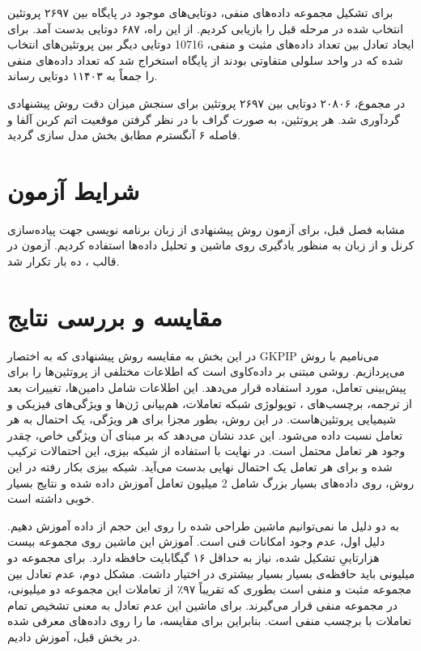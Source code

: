 برای تشکیل مجموعه داده‌های منفی، دوتایی‌های موجود در پایگاه  بین ۲۶۹۷ پروتئین انتخاب شده در مرحله قبل را بازیابی کردیم. از این راه، ۶۸۷ دوتایی بدست آمد. برای ایجاد تعادل بین تعداد داده‌های مثبت و منفی، 10716 دوتایی دیگر بین پروتئین‌های انتخاب شده که در واحد سلولی متفاوتی بودند از پایگاه  استخراج شد که تعداد داده‌های منفی را جمعاً به ۱۱۴۰۳ دوتایی رساند.

در مجموع، ۲۰۸۰۶ دوتایی بین ۲۶۹۷ پروتئین برای سنجش میزان دقت روش پیشنهادی گردآوری شد. هر پروتئین، به صورت گراف با در نظر گرفتن موقعیت اتم کربن آلفا و فاصله ۶ آنگسترم مطابق بخش  مدل سازی گردید.

\section{شرایط آزمون}
مشابه فصل قبل، برای آزمون روش پیشنهادی از زبان برنامه نویسی  جهت پیاده‌سازی کرنل‌ و از زبان  به منظور یادگیری روی ماشین  و تحلیل داده‌ها استفاده کردیم. آزمون در قالب ، ده بار تکرار شد.

\section{مقایسه و بررسی نتایج}
در این بخش به مقایسه روش پیشنهادی که به اختصار GKPIP می‌نامیم با روش  می‌پردازیم.  روشی مبتنی بر داده‌کاوی است که اطلاعات مختلفی از پروتئین‌ها را برای پیش‌بینی تعامل، مورد استفاده قرار می‌دهد. این اطلاعات شامل دامین‌ها، تغییرات بعد از ترجمه، برچسب‌های ، توپولوژی شبکه تعاملات، هم‌بیانی ژن‌ها و ویژگی‌های فیزیکی و شیمیایی پروتئین‌هاست. در این روش، بطور مجزا برای هر ويژگی، یک احتمال به هر تعامل نسبت داده می‌شود. این عدد نشان می‌دهد که بر مبنای آن ویژگی خاص، چقدر وجود هر تعامل محتمل است. در نهایت با استفاده از شبکه بیزی، این احتمالات ترکیب شده و برای هر تعامل یک احتمال نهایی بدست می‌آید.  شبکه بیزی بکار رفته در این روش، روی داده‌های بسیار بزرگ شامل 2 میلیون تعامل آموزش داده شده و  نتایج بسیار خوبی داشته است.

به دو دلیل ما نمی‌توانیم ماشین  طراحی شده را روی این حجم از داده آموزش دهیم. دلیل اول، عدم وجود امکانات فنی است. آموزش این ماشین روی مجموعه بیست هزارتاییِ تشکیل شده، نیاز به حداقل ۱۶ گیگابایت حافظه دارد. برای مجموعه دو میلیونی باید حافظه‌ی بسیار بسیار بیشتری در اختیار داشت. مشکل دوم، عدم تعادل بین مجموعه مثبت و منفی است بطوری که  تقریباً ۹۷٪ از تعاملات این مجموعه دو میلیونی، در مجموعه منفی قرار می‌گیرند. برای ماشین  این عدم تعادل به معنی تشخیص تمام تعاملات با برچسب منفی است. بنابراین برای مقایسه، ما  را روی داده‌های معرفی شده در بخش قبل، آموزش دادیم.

